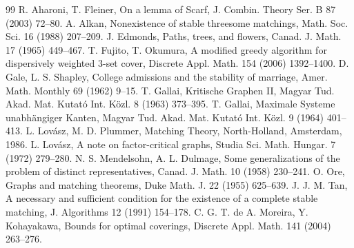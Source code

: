 \documentclass[10pt,a4paper]{amsart}
\begin{document}
\begin{thebibliography}{99}
 R. Aharoni, T. Fleiner, On a lemma of Scarf, J. Combin. Theory Ser. B 87 (2003) 72--80.
 A. Alkan, Nonexistence of stable threesome matchings, Math. Soc. Sci. 16 (1988) 207--209.
 J. Edmonds, Paths, trees, and flowers, Canad. J. Math. 17 (1965) 449--467.
 T. Fujito, T. Okumura, A modified greedy algorithm for dispersively weighted $3$-set cover, Discrete Appl. Math. 154 (2006) 1392--1400.
 D. Gale, L. S. Shapley, College admissions and the stability of marriage, Amer. Math. Monthly 69 (1962) 9--15.
 T. Gallai, Kritische Graphen II, Magyar Tud. Akad. Mat. Kutat\'o Int. K\"ozl. 8 (1963) 373--395.
 T. Gallai, Maximale Systeme unabh\"angiger Kanten, Magyar Tud. Akad. Mat. Kutat\'o Int. K\"ozl. 9 (1964) 401--413.
 L. Lov\'asz, M. D. Plummer, Matching Theory, North-Holland, Amsterdam, 1986.
 L. Lov\'asz, A note on factor-critical graphs, Studia Sci. Math. Hungar. 7 (1972) 279--280.
 N. S. Mendelsohn, A. L. Dulmage, Some generalizations of the problem of distinct representatives, Canad. J. Math. 10 (1958) 230--241.
 O. Ore, Graphs and matching theorems, Duke Math. J. 22 (1955) 625--639.
 J. J. M. Tan, A necessary and sufficient condition for the existence of a complete stable matching, J. Algorithms 12 (1991) 154--178.
 C. G. T. de A. Moreira, Y. Kohayakawa, Bounds for optimal coverings, Discrete Appl. Math. 141 (2004) 263--276.
\end{thebibliography}
\end{document}
